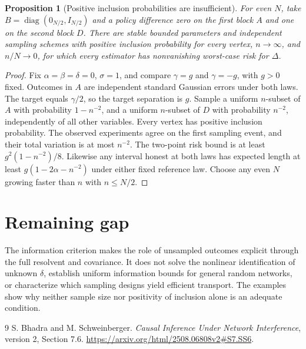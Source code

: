 \documentclass[11pt]{article}
\newtheorem{proposition}[theorem]{Proposition}
\theoremstyle{remark}
\begin{document}
\begin{proposition}[Positive inclusion probabilities are insufficient]
For even $N$, take $B=\operatorname{diag}(0_{N/2},I_{N/2})$ and a policy difference zero on the first block $A$ and one on the second block $D$. There are stable bounded parameters and independent sampling schemes with positive inclusion probability for every vertex, $n\to\infty$, and $n/N\to0$, for which every estimator has nonvanishing worst-case risk for $\Delta$.
\end{proposition}
\begin{proof}
Fix $\alpha=\beta=\delta=0$, $\sigma=1$, and compare $\gamma=g$ and $\gamma=-g$, with $g>0$ fixed. Outcomes in $A$ are independent standard Gaussian errors under both laws. The target equals $\gamma/2$, so the target separation is $g$. Sample a uniform $n$-subset of $A$ with probability $1-n^{-2}$, and a uniform $n$-subset of $D$ with probability $n^{-2}$, independently of all other variables. Every vertex has positive inclusion probability. The observed experiments agree on the first sampling event, and their total variation is at most $n^{-2}$. The two-point risk bound is at least $g^2(1-n^{-2})/8$. Likewise any interval honest at both laws has expected length at least $g(1-2\alpha-n^{-2})$ under either fixed reference law. Choose any even $N$ growing faster than $n$ with $n\le N/2$.
\end{proof}

\section*{Remaining gap}
The information criterion makes the role of unsampled outcomes explicit through the full resolvent and covariance. It does not solve the nonlinear identification of unknown $\delta$, establish uniform information bounds for general random networks, or characterize which sampling designs yield efficient transport. The examples show why neither sample size nor positivity of inclusion alone is an adequate condition.

\begin{thebibliography}{9}
 S. Bhadra and M. Schweinberger. \emph{Causal Inference Under Network Interference}, version 2, Section 7.6. \url{https://arxiv.org/html/2508.06808v2#S7.SS6}.
\end{thebibliography}
\end{document}
